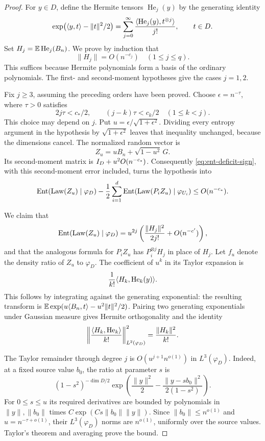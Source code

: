 \begin{proof}
For \(y\in D\), define the Hermite tensors \(\operatorname{He}_j(y)\)
by the generating identity
\[
 \exp\bigl(\langle y,t\rangle-\|t\|^2/2\bigr)
 =\sum_{j=0}^\infty
       \frac{\langle \operatorname{He}_j(y),t^{\otimes j}\rangle}{j!},
 \qquad t\in D.
\]
Set \(H_j=\mathbb E\operatorname{He}_j(B_n)\). We prove by induction that
\begin{equation}\label{eq:ent-hermite-small}
 \|H_j\|=O(n^{-c_j})
 \quad(1\le j\le q).
\end{equation}
This suffices because Hermite polynomials form a basis of the ordinary
polynomials. The first- and second-moment hypotheses give the cases
\(j=1,2\).

Fix \(j\ge3\), assuming the preceding orders have been proved.
Choose \(\epsilon=n^{-\tau}\), where \(\tau>0\) satisfies
\[
 2j\tau<c_*/2,\qquad
 (j-k)\tau<c_k/2\quad(1\le k<j).
\]
This choice may depend on \(j\).
Put \(u=\epsilon/\sqrt{1+\epsilon^2}\).
Dividing every entropy argument in the hypothesis by
\(\sqrt{1+\epsilon^2}\) leaves that inequality unchanged, because
the dimensions cancel. The normalized random vector is
\[
 Z_u=uB_n+\sqrt{1-u^2}\,G.
\]
Its second-moment matrix is \(I_D+u^2O(n^{-c_*})\).
Consequently \eqref{eq:ent-deficit-sign}, with this second-moment
error included, turns the hypothesis into
\begin{equation}\label{eq:ent-relative-deficit}
 \operatorname{Ent}(\operatorname{Law}(Z_u)\mid\varphi_D)
 -\frac12\sum_{i=1}^d
       \operatorname{Ent}(\operatorname{Law}(P_iZ_u)\mid\varphi_{U_i})
 \le O(n^{-c_*}).
\end{equation}

We claim that
\begin{equation}\label{eq:ent-relative-expansion}
 \operatorname{Ent}(\operatorname{Law}(Z_u)\mid\varphi_D)
 =u^{2j}\left(\frac{\|H_j\|^2}{2j!}+O(n^{-c'})\right),
\end{equation}
and that the analogous formula for \(P_iZ_u\) has
\(P_i^{\otimes j}H_j\) in place of \(H_j\).
Let \(f_u\) denote the density ratio of \(Z_u\) to \(\varphi_D\).
The coefficient of \(u^k\) in its Taylor expansion is
\[
 \frac1{k!}\langle H_k,\operatorname{He}_k(y)\rangle.
\]
This follows by integrating against the generating exponential:
the resulting transform is
\(\mathbb E\exp(u\langle B_n,t\rangle-u^2\|t\|^2/2)\).
Pairing two generating exponentials under Gaussian measure gives
Hermite orthogonality and the identity
\[
 \left\|\frac{\langle H_k,\operatorname{He}_k\rangle}{k!}\right\|_{L^2(\varphi_D)}^2
 =\frac{\|H_k\|^2}{k!}.
\]

The Taylor remainder through degree \(j\) is
\(O(u^{j+1}n^{o(1)})\) in \(L^3(\varphi_D)\).
Indeed, at a fixed source value \(b_0\), the ratio at parameter \(s\) is
\[
 (1-s^2)^{-\dim D/2}
 \exp\left(\frac{\|y\|^2}{2}
       -\frac{\|y-sb_0\|^2}{2(1-s^2)}\right).
\]
For \(0\le s\le u\) its required derivatives are bounded by
polynomials in \(\|y\|,\|b_0\|\) times
\(C\exp(Cs\|b_0\|\|y\|)\).
Since \(\|b_0\|\le n^{o(1)}\) and \(u=n^{-\tau+o(1)}\),
their \(L^3(\varphi_D)\) norms are \(n^{o(1)}\), uniformly over
the source values. Taylor's theorem and averaging prove the bound.


\end{proof}
